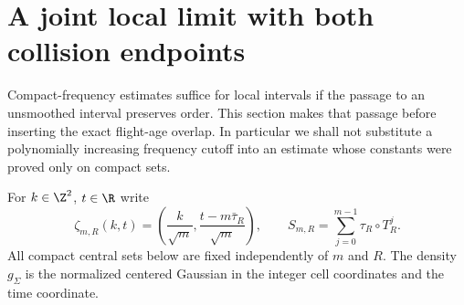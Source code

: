 \section{A joint local limit with both collision endpoints}
\label{sec:collision-mixing-local-limit}
Compact-frequency estimates suffice for local intervals if the passage
to an unsmoothed interval preserves order. This section makes that
passage before inserting the exact flight-age overlap. In particular
we shall not substitute a polynomially increasing frequency cutoff
into an estimate whose constants were proved only on compact sets.

For $k\in\Z^2$, $t\in\R$ write
\[
 \zeta_{m,R}(k,t)=
 \left(\frac{k}{\sqrt m},\frac{t-m\bar\tau_R}{\sqrt m}\right),
 \qquad S_{m,R}=\sum_{j=0}^{m-1}\tau_R\circ T_R^j.
\]
All compact central sets below are fixed independently of $m$ and $R$.
The density $g_\Sigma$ is the normalized centered Gaussian in the
integer cell coordinates and the time coordinate.

